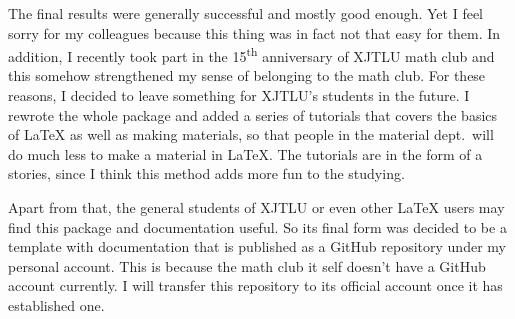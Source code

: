 The final results were generally successful and mostly good enough. Yet I feel sorry for my colleagues because this thing was in fact not that easy for them. In addition, I recently took part in the 15\textsuperscript{th} anniversary of XJTLU math club and this somehow strengthened my sense of belonging to the math club. For these reasons, I decided to leave something for XJTLU's students in the future. I rewrote the whole package and added a series of tutorials that covers the basics of \LaTeX{} as well as making materials, so that people in the material dept.~will do much less to make a material in \LaTeX. The tutorials are in the form of a stories, since I think this method adds more fun to the studying.

Apart from that, the general students of XJTLU or even other \LaTeX{} users may find this package and documentation useful. So its final form was decided to be a template with documentation that is published as a GitHub repository under my personal account. This is because the math club it self doesn't have a GitHub account currently. I will transfer this repository to its official account once it has established one.